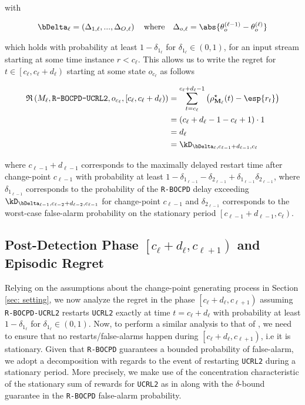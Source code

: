\documentclass{article} %
\begin{document}
with 

\begin{align*}
\bDelta_\ell = \left(\Delta_{1,\ell},...,\Delta_{O,\ell} \right) \quad \text{where} \quad \Delta_{o,\ell} =  \abs{\theta^{(\ell-1)}_o - \theta^{(\ell)}_o}
\end{align*}

which holds with probability at least $1-\delta_{1_\ell}$ for $\delta_{1_\ell} \in (0, 1)$, for an input stream starting at some time instance $r < c_\ell$. This allows us to write the regret for $t \in \left[c_\ell, c_\ell+d_{\ell}\right)$ starting at some state $o_{c_\ell}$ as follows 

\begin{align*}
\mathfrak{R}\left(M_\ell, \texttt{R-BOCPD-UCRL2}, o_{c_\ell}, \left[c_\ell, c_\ell+d_{\ell}\right) \right) & =\sum_{t=c_\ell}^{c_\ell+d_{\ell}-1}\left(\rho_{\mathbf{M_\ell}}^\star(t)- \esp{r_t} \right) \\
& = (c_\ell+d_{\ell}-1 - c_\ell + 1) \cdot 1 \\
& = d_\ell \\
& = \kD_{\bDelta_\ell,c_{\ell-1}+d_{\ell-1},c_\ell}
\end{align*}

where $c_{\ell-1}+d_{\ell-1}$ corresponds to the maximally delayed restart time after change-point $c_{\ell-1}$ with probability at least $1-\delta_{1_{\ell-1}}-\delta_{2_{\ell-1}}+\delta_{1_{\ell-1}}\delta_{2_{\ell-1}}$, where $\delta_{1_{\ell-1}}$ corresponds to the probability of the \texttt{R-BOCPD} delay exceeding $\kD_{\bDelta_{\ell-1},c_{\ell-2}+d_{\ell-2},c_{\ell-1}}$ for change-point $c_{\ell-1}$ and $\delta_{2_{\ell-1}}$ corresponds to the worst-case false-alarm probability on the stationary period $\left[c_{\ell-1}+d_{\ell-1}, c_{\ell}\right)$.

\subsection{Post-Detection Phase $\left[c_\ell+d_{\ell}, c_{\ell+1}\right)$ and Episodic Regret}
Relying on the assumptions about the change-point generating process in Section \ref{sec: setting}, we now analyze the regret in the phase $\left[c_\ell+d_{\ell}, c_{\ell+1}\right)$ assuming \texttt{R-BOCPD-UCRL2} restarts \texttt{UCRL2} exactly at time $t=c_\ell + d_\ell$ with probability at least $1-\delta_{1_\ell}$ for $\delta_{1_\ell} \in (0, 1)$. Now, to perform a similar analysis to that of \cite{auer2008near}, we need to ensure that no restarts/false-alarms happen during $\left[c_\ell+d_{\ell}, c_{\ell+1}\right)$, i.e it is stationary. Given that \texttt{R-BOCPD} guarantees a bounded probability of false-alarm, we adopt a decomposition with regards to the event of restarting \texttt{UCRL2} during a stationary period. More precisely, we make use of the concentration characteristic of the stationary sum of rewards for \texttt{UCRL2} as in \cite{auer2008near} along with the $\delta$-bound guarantee in the \texttt{R-BOCPD} false-alarm probability. 
\end{document}
